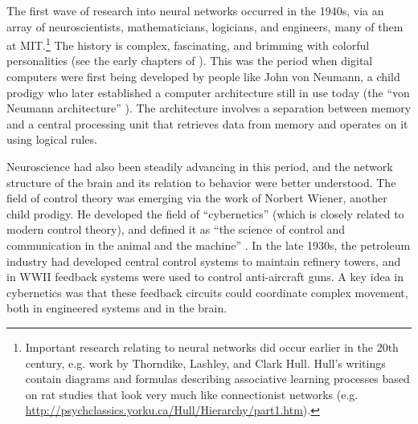 The first wave of research into neural networks occurred in the 1940s, via an array of neuroscientists, mathematicians, logicians, and engineers, many of them at MIT.\footnote{Important research relating to neural networks did occur earlier in the 20th century, e.g. work by Thorndike, Lashley, and Clark Hull. Hull's writings contain diagrams and formulas describing associative learning processes based on rat studies that look very much like connectionist networks (e.g. \url{http://psychclassics.yorku.ca/Hull/Hierarchy/part1.htm}).}   The history is complex, fascinating, and brimming with colorful personalities (see the early chapters of \cite{anderson2000talking}). This was the period when digital computers were first being developed by people like John von Neumann, a child prodigy who  later established a computer architecture still in use today (the ``von Neumann architecture'' \cite{von1981principles}). The architecture involves a separation between memory and a central processing unit that retrieves data from memory and operates on it using logical rules.

Neuroscience had also been steadily advancing in this period, and the network structure of the brain and its relation to behavior were better understood. The field of control theory was emerging via the work of Norbert Wiener, another child prodigy. He developed the field of ``cybernetics'' (which is closely related to modern control theory), and defined it as ``the science of control and communication in the animal and the machine'' \cite[p. 16]{wiener1948cybernetics}. In the late 1930s, the petroleum industry had developed central control systems to maintain refinery towers, and in WWII feedback systems were used to control anti-aircraft guns. A key idea in cybernetics was that these feedback circuits could coordinate complex movement, both in engineered systems and in the brain.


